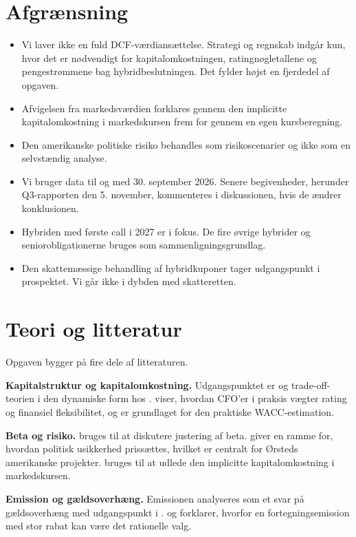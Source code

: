 \documentclass[11pt,a4paper]{article}
\begin{document}
\section{Afgrænsning}

\begin{itemize}
  \item Vi laver ikke en fuld DCF-værdiansættelse. Strategi og regnskab indgår kun, hvor det er nødvendigt for kapitalomkostningen, ratingnøgletallene og pengestrømmene bag hybridbeslutningen. Det fylder højst en fjerdedel af opgaven.
  \item Afvigelsen fra markedsværdien forklares gennem den implicitte kapitalomkostning i markedskursen frem for gennem en egen kursberegning.
  \item Den amerikanske politiske risiko behandles som risikoscenarier og ikke som en selvstændig analyse.
  \item Vi bruger data til og med 30. september 2026. Senere begivenheder, herunder Q3-rapporten den 5. november, kommenteres i diskussionen, hvis de ændrer konklusionen.
  \item Hybriden med første call i 2027 er i fokus. De fire øvrige hybrider og seniorobligationerne bruges som sammenligningsgrundlag.
  \item Den skattemæssige behandling af hybridkuponer tager udgangspunkt i prospektet. Vi går ikke i dybden med skatteretten.
\end{itemize}

\section{Teori og litteratur}

Opgaven bygger på fire dele af litteraturen.

\textbf{Kapitalstruktur og kapitalomkostning.} Udgangspunktet er \citet{modigliani1958, modigliani1963} og trade-off-teorien i den dynamiske form hos \citet{leland1994}. \citet{graham2001} viser, hvordan CFO'er i praksis vægter rating og finansiel fleksibilitet, og \citet{koller2020} er grundlaget for den praktiske WACC-estimation.

\textbf{Beta og risiko.} \citet{blume1971} bruges til at diskutere justering af beta. \citet{pastor2013} giver en ramme for, hvordan politisk usikkerhed prissættes, hvilket er centralt for Ørsteds amerikanske projekter. \citet{gebhardt2001} bruges til at udlede den implicitte kapitalomkostning i markedskursen.

\textbf{Emission og gældsoverhæng.} Emissionen analyseres som et svar på gældsoverhæng med udgangspunkt i \citet{myers1977}. \citet{myers1984} og \citet{eckbo1992} forklarer, hvorfor en fortegningsemission med stor rabat kan være det rationelle valg.
\end{document}
